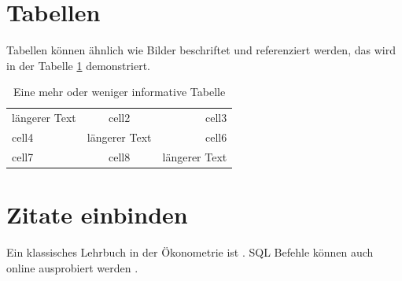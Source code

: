 \documentclass{article}
\begin{document}
\section{Tabellen}

Tabellen können ähnlich wie Bilder beschriftet und referenziert werden, das wird in der Tabelle \ref{table:data} demonstriert.

\begin{table}[ht]
    \centering
    \begin{tabular}{|l|c|r|} 
         \hline
         längerer Text & cell2         & cell3 \\ 
         cell4         & längerer Text & cell6 \\ 
         cell7         & cell8         & längerer Text \\ 
         \hline
    \end{tabular}
    \caption{Eine mehr oder weniger informative Tabelle}
    \label{table:data}
\end{table}

\section{Zitate einbinden}

Ein klassisches Lehrbuch in der Ökonometrie ist \cite{wooldridge}. SQL Befehle können auch online ausprobiert werden \cite{sqllite}.



\end{document}

